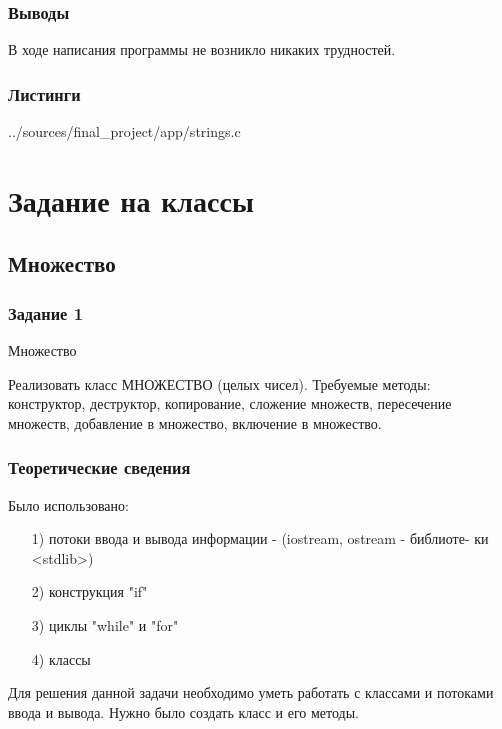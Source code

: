 \documentclass[12pt,a4paper]{report}
\begin{document}
\subsection{Выводы}

В ходе написания программы не возникло никаких трудностей.

\subsection*{Листинги}


{../sources/final_project/app/strings.c}



\chapter{Задание на классы}

\section{Множество}

\subsection{Задание 1}
Множество

Реализовать класс МНОЖЕСТВО (целых чисел). Требуемые методы: конструктор, деструктор, копирование, сложение множеств, пересечение множеств, добавление в множество, включение в множество.

\subsection{Теоретические сведения}

Было использовано:
\begin{enumerate}
\item[1)] потоки ввода и вывода информации  - (iostream, ostream - библиоте-
ки <stdlib>)
\item[2)] конструкция "if"
\item[3)] циклы "while" и "for"
\item[4)] классы
\end{enumerate}

Для решения данной задачи необходимо уметь работать с классами и потоками ввода и вывода.
Нужно было создать класс и его методы.
\end{document}
